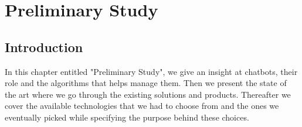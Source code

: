 
\chapter{Preliminary Study} %

\label{Chapter2} %


\newcommand{\keyword}[1]{\textbf{#1}}
\newcommand{\tabhead}[1]{\textbf{#1}}
\newcommand{\code}[1]{\texttt{#1}}
\newcommand{\file}[1]{\texttt{\bfseries#1}}
\newcommand{\option}[1]{\texttt{\itshape#1}}


\section{Introduction}
In this chapter entitled "Preliminary Study", we give an insight at chatbots, their role and the algorithms that helps manage them. Then we present the state of the art where we go through the existing solutions and products. Thereafter we cover the available technologies that we had to choose from and the ones we eventually picked while specifying the purpose behind these choices.


